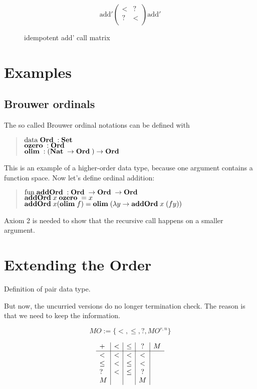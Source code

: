 \begin{figure}[p]

\[
\mathrm{add'} \begin{pmatrix}

< & ?    \\
? & <    \\

\end{pmatrix} \mathrm{add'}
\] 
\caption{idempotent add' call matrix}

\end{figure}

\section{Examples}

\subsection{Brouwer ordinals}
The so called Brouwer ordinal notations can be defined with
\begin{quote}
$\mathrm{data}\; \mathbf{Ord}\; : \mathbf{Set}$ 
\\
$\mathbf{ozero}\; : \mathbf{Ord}\; $
\\
$\mathbf{olim}\; : (\mathbf{Nat}\; \rightarrow \mathbf{Ord}\; ) \rightarrow \mathbf{Ord}\; $
\end{quote}
This is an example of a higher-order data type, because one argument contains a function space.
Now let's define ordinal addition:
\begin{quote}
$\mathrm{fun}\; \mathbf{addOrd}\; : \mathbf{Ord}\; \rightarrow \mathbf{Ord}\; \rightarrow \mathbf{Ord}\;$
\\
$\mathbf{addOrd}\; x \; \mathbf{ozero}\; = x $
\\
$\mathbf{addOrd}\; x (\mathbf{olim}\; f) = \mathbf{olim}\; ( \lambda y \rightarrow \mathbf{addOrd}\;  x \; (f y))  $
\end{quote}
Axiom 2 is needed to show that the recursive call happens on a smaller argument.
\section{Extending the Order}

Definition of pair data type.

But now, the uncurried versions do no longer termination check.
The reason is that we need to keep the information.

\begin{definition}[MOrder]
\[ MO := \{ < , \leq , ? , MO^{r,n}\} \]
\end{definition}

\begin{definition}
\[
\begin{array}{l | c |c | c | c}

 +    &  <   &  \leq   &  ? & M \\
 \hline 
 <    &  <   & <       &  < &  \\
 \leq &  <   & \leq    &  < &  \\
 ?    &  <   & \leq    &  ? &  \\
 M    &      &         &  M &  
\end{array}
\]

\end{definition}


